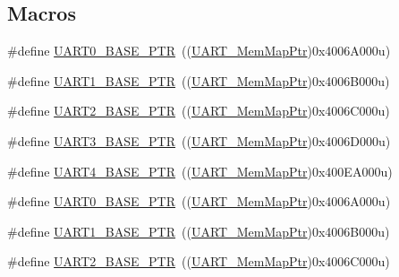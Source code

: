 \subsection*{Macros}
\begin{DoxyCompactItemize}
\item 
\#define \hyperlink{group___u_a_r_t___peripheral_ga50a02c91ffbd11fa7b4f0c33fe585199}{U\+A\+R\+T0\+\_\+\+B\+A\+S\+E\+\_\+\+P\+TR}~((\hyperlink{group___u_a_r_t___peripheral_ga306cf44b593fadbb29a065f42e3f68f0}{U\+A\+R\+T\+\_\+\+Mem\+Map\+Ptr})0x4006\+A000u)
\item 
\#define \hyperlink{group___u_a_r_t___peripheral_gafb5b1236c1cdf2d9a6464251b791030c}{U\+A\+R\+T1\+\_\+\+B\+A\+S\+E\+\_\+\+P\+TR}~((\hyperlink{group___u_a_r_t___peripheral_ga306cf44b593fadbb29a065f42e3f68f0}{U\+A\+R\+T\+\_\+\+Mem\+Map\+Ptr})0x4006\+B000u)
\item 
\#define \hyperlink{group___u_a_r_t___peripheral_ga75ca2ea4e490b3c1c7aa55fc9c25cd37}{U\+A\+R\+T2\+\_\+\+B\+A\+S\+E\+\_\+\+P\+TR}~((\hyperlink{group___u_a_r_t___peripheral_ga306cf44b593fadbb29a065f42e3f68f0}{U\+A\+R\+T\+\_\+\+Mem\+Map\+Ptr})0x4006\+C000u)
\item 
\#define \hyperlink{group___u_a_r_t___peripheral_gadf42d0466618b9209401839e1af9b3c4}{U\+A\+R\+T3\+\_\+\+B\+A\+S\+E\+\_\+\+P\+TR}~((\hyperlink{group___u_a_r_t___peripheral_ga306cf44b593fadbb29a065f42e3f68f0}{U\+A\+R\+T\+\_\+\+Mem\+Map\+Ptr})0x4006\+D000u)
\item 
\#define \hyperlink{group___u_a_r_t___peripheral_ga680f97e081544c697ee071702b2de587}{U\+A\+R\+T4\+\_\+\+B\+A\+S\+E\+\_\+\+P\+TR}~((\hyperlink{group___u_a_r_t___peripheral_ga306cf44b593fadbb29a065f42e3f68f0}{U\+A\+R\+T\+\_\+\+Mem\+Map\+Ptr})0x400\+E\+A000u)
\item 
\#define \hyperlink{group___u_a_r_t___peripheral_ga50a02c91ffbd11fa7b4f0c33fe585199}{U\+A\+R\+T0\+\_\+\+B\+A\+S\+E\+\_\+\+P\+TR}~((\hyperlink{group___u_a_r_t___peripheral_ga306cf44b593fadbb29a065f42e3f68f0}{U\+A\+R\+T\+\_\+\+Mem\+Map\+Ptr})0x4006\+A000u)
\item 
\#define \hyperlink{group___u_a_r_t___peripheral_gafb5b1236c1cdf2d9a6464251b791030c}{U\+A\+R\+T1\+\_\+\+B\+A\+S\+E\+\_\+\+P\+TR}~((\hyperlink{group___u_a_r_t___peripheral_ga306cf44b593fadbb29a065f42e3f68f0}{U\+A\+R\+T\+\_\+\+Mem\+Map\+Ptr})0x4006\+B000u)
\item 
\#define \hyperlink{group___u_a_r_t___peripheral_ga75ca2ea4e490b3c1c7aa55fc9c25cd37}{U\+A\+R\+T2\+\_\+\+B\+A\+S\+E\+\_\+\+P\+TR}~((\hyperlink{group___u_a_r_t___peripheral_ga306cf44b593fadbb29a065f42e3f68f0}{U\+A\+R\+T\+\_\+\+Mem\+Map\+Ptr})0x4006\+C000u)

\end{DoxyCompactItemize}
